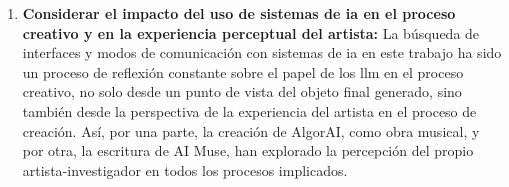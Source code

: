\begin{enumerate}[label=\alph*)]
    \item \textbf{Considerar el impacto del uso de sistemas de \gls{ia} en el proceso creativo y en la experiencia perceptual del artista:} La búsqueda de interfaces y modos de comunicación con sistemas de \gls{ia} en este trabajo ha sido un proceso de reflexión constante sobre el papel de los \gls{llm} en el proceso creativo, no solo desde un punto de vista del objeto final generado, sino también desde la perspectiva de la experiencia del artista en el proceso de creación. Así, por una parte, la creación de AlgorAI, como obra musical, y por otra, la escritura de AI Muse, han explorado la percepción del propio artista-investigador en todos los procesos implicados.
\end{enumerate}
